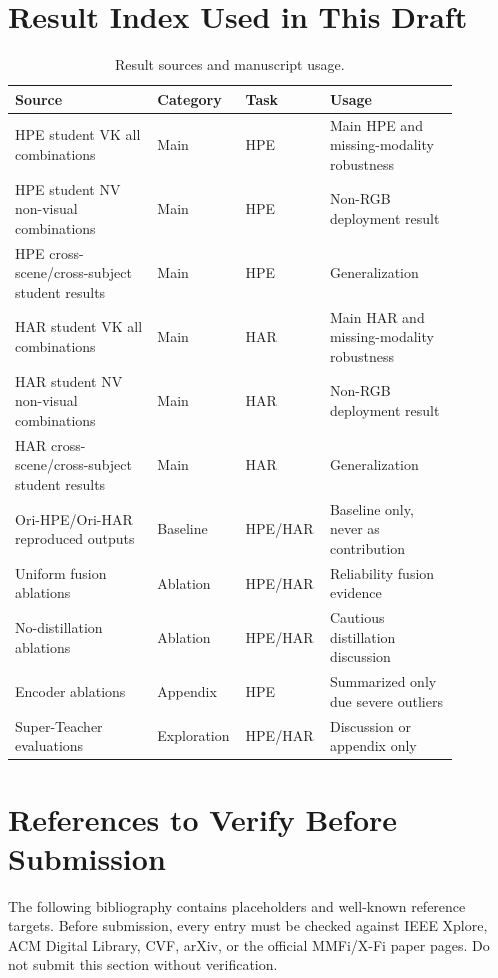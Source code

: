 \documentclass[journal]{IEEEtran}
\begin{document}
\appendices

\section{Result Index Used in This Draft}

\begin{table}[h]
\centering
\caption{Result sources and manuscript usage.}
\label{tab:result_index}
\begin{tabular}{p{0.31\linewidth}p{0.13\linewidth}p{0.16\linewidth}p{0.28\linewidth}}
\toprule
Source & Category & Task & Usage \\
\midrule
HPE student VK all combinations & Main & HPE & Main HPE and missing-modality robustness \\
HPE student NV non-visual combinations & Main & HPE & Non-RGB deployment result \\
HPE cross-scene/cross-subject student results & Main & HPE & Generalization \\
HAR student VK all combinations & Main & HAR & Main HAR and missing-modality robustness \\
HAR student NV non-visual combinations & Main & HAR & Non-RGB deployment result \\
HAR cross-scene/cross-subject student results & Main & HAR & Generalization \\
Ori-HPE/Ori-HAR reproduced outputs & Baseline & HPE/HAR & Baseline only, never as contribution \\
Uniform fusion ablations & Ablation & HPE/HAR & Reliability fusion evidence \\
No-distillation ablations & Ablation & HPE/HAR & Cautious distillation discussion \\
Encoder ablations & Appendix & HPE & Summarized only due severe outliers \\
Super-Teacher evaluations & Exploration & HPE/HAR & Discussion or appendix only \\
\bottomrule
\end{tabular}
\end{table}

\section{References to Verify Before Submission}

The following bibliography contains placeholders and well-known reference targets. Before submission, every entry must be checked against IEEE Xplore, ACM Digital Library, CVF, arXiv, or the official MMFi/X-Fi paper pages. Do not submit this section without verification.
\end{document}
